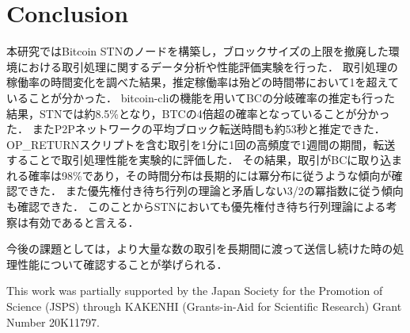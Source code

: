 \documentclass[graybox]{svmult}
\begin{document}
\section{Conclusion}
\label{sec:conclusion}

本研究ではBitcoin STNのノードを構築し，ブロックサイズの上限を撤廃した環境における取引処理に関するデータ分析や性能評価実験を行った．
取引処理の稼働率の時間変化を調べた結果，推定稼働率は殆どの時間帯において1を超えていることが分かった．
bitcoin-cliの機能を用いてBCの分岐確率の推定も行った結果，STNでは約8.5\%となり，BTCの4倍超の確率となっていることが分かった．
またP2Pネットワークの平均ブロック転送時間も約53秒と推定できた．
OP\_RETURNスクリプトを含む取引を1分に1回の高頻度で1週間の期間，転送することで取引処理性能を実験的に評価した．
その結果，取引がBCに取り込まれる確率は98\%であり，その時間分布は長期的には冪分布に従うような傾向が確認できた．
また優先権付き待ち行列の理論と矛盾しない3/2の冪指数に従う傾向も確認できた．
このことからSTNにおいても優先権付き待ち行列理論による考察は有効であると言える．

今後の課題としては，より大量な数の取引を長期間に渡って送信し続けた時の処理性能について確認することが挙げられる．



\begin{acknowledgement}
 This work was partially supported by the Japan Society for the Promotion of 
Science (JSPS) through KAKENHI (Grants-in-Aid for Scientific Research) Grant 
Number 20K11797. 
\end{acknowledgement}



\end{document}
